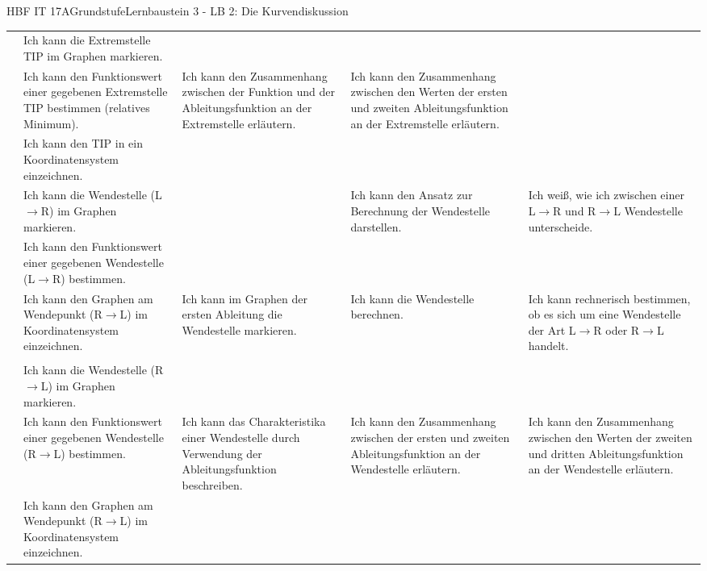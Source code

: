 \documentclass[oneside,openany,headings=optiontotoc,12pt,numbers=noenddot]{article}
\begin{document}
\begin{worksheet}{HBF IT 17A}{Grundstufe}{Lernbaustein 3 - LB 2: Die Kurvendiskussion}
\begin{framed}
\begin{tabularx}{\textwidth}{l|X|X|X|X|}
				& Ich kann die Extremstelle TIP im Graphen markieren.& & & \\
				\cline{2-4}
				\multirow{2}{*}{\tabrotate{Extremstelle TIP}}
				& Ich kann den Funktionswert einer gegebenen Extremstelle TIP bestimmen  (\colorbox{blue!5}{relatives Minimum}).& Ich kann den Zusammenhang zwischen der Funktion und der Ableitungsfunktion an der Extremstelle erläutern. & Ich kann den Zusammenhang zwischen den Werten der ersten und zweiten Ableitungsfunktion an der Extremstelle erläutern. &\\
				\cline{2-2}
				& Ich kann den TIP in ein Koordinatensystem einzeichnen. & & &\\
				\hline\hline
				
				& Ich kann die Wendestelle (L\(\rightarrow\)R) im Graphen markieren. & & Ich kann den Ansatz zur Berechnung der Wendestelle darstellen. & Ich weiß, wie ich zwischen einer L\(\rightarrow\)R und R\(\rightarrow\)L Wendestelle unterscheide.\\
				\cline{2-2}
				\multirow{2}{*}{\tabrotate{Wendestelle L\(\rightarrow\)R}}
				& Ich kann den Funktionswert einer gegebenen Wendestelle (L\(\rightarrow\)R) bestimmen. & & &\\
				\cline{2-5}
				& Ich kann den Graphen am Wendepunkt (R\(\rightarrow\)L) im Koordinatensystem einzeichnen. & Ich kann im Graphen der ersten Ableitung die Wendestelle markieren. & Ich kann die Wendestelle berechnen. & Ich kann rechnerisch bestimmen, ob es sich um eine Wendestelle der Art L\(\rightarrow\)R oder R\(\rightarrow\)L handelt.\\
				& & & &\\
				\hhline{=|=|~|~|~|}
				& Ich kann die Wendestelle (R\(\rightarrow\)L) im Graphen markieren. & & & \\
				\cline{2-5}
				\multirow{2}{*}{\tabrotate{Wendestelle R\(\rightarrow\)L}}
				& Ich kann den Funktionswert einer gegebenen Wendestelle (R\(\rightarrow\)L) bestimmen. & Ich kann das Charakteristika einer Wendestelle durch Verwendung der Ableitungsfunktion beschreiben. & Ich kann den Zusammenhang zwischen der ersten und zweiten Ableitungsfunktion an der Wendestelle erläutern. & Ich kann den Zusammenhang zwischen den Werten der zweiten und dritten Ableitungsfunktion an der Wendestelle erläutern.\\
				\cline{2-2}
				& Ich kann den Graphen am Wendepunkt (R\(\rightarrow\)L) im Koordinatensystem einzeichnen. & & &\\
				\cline{2-5}
			\end{tabularx}
		\end{framed}
	\end{worksheet}
\end{document}

